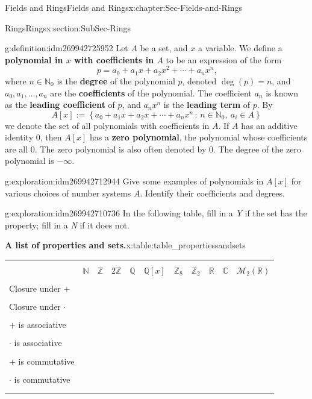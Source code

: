 \documentclass[oneside,10pt,]{book}
\newcommand{\tabularfont}{\relax}
\newcommand{\terminology}[1]{\textbf{#1}}
\numberwithin{equation}{section}
\newcommand{\hrulethin}  {\noalign{\hrule height 0.04em}}
\newcommand{\setof}[2]{{\left\{#1\,\colon\,#2\right\}}}
\def\C{{\mathbb C}}
\def\Z{{\mathbb Z}}
\def\Q{{\mathbb Q}}
\def\N{{\mathbb N}}
\def\R{{\mathbb R}}
\begin{document}
\begin{chapterptx}{Fields and Rings}{}{Fields and Rings}{}{}{x:chapter:Sec-Fields-and-Rings}
\begin{sectionptx}{Rings}{}{Rings}{}{}{x:section:SubSec-Rings}
\begin{definition}{}{g:definition:idm269942725952}
Let \(A\) be a set, and \(x\) a variable. We define a \terminology{polynomial in \(x\) with coefficients in \(A\)} to be an expression of the form%
\begin{equation*}
p = a_0 + a_1 x + a_2 x^2 + \cdots + a_n x^n\text{,}
\end{equation*}
where \(n\in \N_0\) is the \terminology{degree} of the polynomial \(p\), denoted \(\deg(p) = n\), and \(a_0,a_1,\ldots,
a_n\) are the \terminology{coefficients} of the polynomial. The coefficient \(a_n\) is known as the \terminology{leading coefficient} of \(p\), and \(a_n x^n\) is the \terminology{leading term} of \(p\). By%
\begin{equation*}
A[x] := \setof{a_0 + a_1 x + a_2 x + \cdots + a_n x^n}{n\in \N_0, \ a_i\in A}
\end{equation*}
we denote the set of all polynomials with coefficients in \(A\). If \(A\) has an additive identity \(0\), then \(A[x]\) has a \terminology{zero polynomial}, the polynomial whose coefficients are all \(0\). The zero polynomial is also often denoted by \(0\). The degree of the zero polynomial is \(-\infty\).%
\end{definition}
\begin{exploration}{}{g:exploration:idm269942712944}%
Give some examples of polynomials in \(A[x]\) for various choices of number systems \(A\). Identify their coefficients and degrees.%
\end{exploration}
\begin{exploration}{}{g:exploration:idm269942710736}%
In the following table, fill in a \emph{Y} if the set has the property; fill in a \emph{N} if it does not.%
\begin{tableptx}{\textbf{A list of properties and sets.}}{x:table:table_propertiessandsets}{}%
\centering
{\tabularfont%
\begin{tabular}{lllllllllll}
&&&&&&&&&&\tabularnewline\hrulethin
&\(\N\)&\(\Z\)&\(2\Z\)&\(\Q\)&\(\Q[x]\)&\(\Z_{8}\)&\(\Z_{2}\)&\(\R\)&\(\C\)&\(\mathcal{M}_2(\R)\)\tabularnewline[0pt]
&&&&&&&&&&\tabularnewline\hrulethin
Closure under +&&&&&&&&&&\tabularnewline[0pt]
&&&&&&&&&&\tabularnewline\hrulethin
Closure under \(\cdot\)&&&&&&&&&&\tabularnewline[0pt]
&&&&&&&&&&\tabularnewline\hrulethin
\(+\) is associative&&&&&&&&&&\tabularnewline[0pt]
&&&&&&&&&&\tabularnewline\hrulethin
\(\cdot\) is associative&&&&&&&&&&\tabularnewline[0pt]
&&&&&&&&&&\tabularnewline\hrulethin
+ is commutative&&&&&&&&&&\tabularnewline[0pt]
&&&&&&&&&&\tabularnewline\hrulethin
\(\cdot\) is commutative&&&&&&&&&&\tabularnewline[0pt]
&&&&&&&&&&\tabularnewline\hrulethin

\end{tabular}}
\end{tableptx}
\end{exploration}
\end{sectionptx}
\end{chapterptx}
\end{document}
